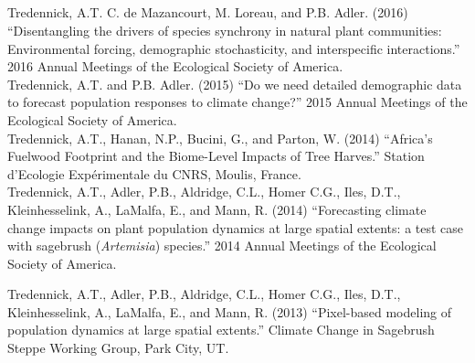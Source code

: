 \documentclass[margin,line]{resume}
\begin{document}
\begin{resume}
     \section{\textmd{\textsf{\color{MidnightBlue}{Presentations}}}}
        Tredennick, A.T. C. de Mazancourt, M. Loreau, and P.B. Adler. (2016) ``Disentangling the drivers of species synchrony in natural plant communities: Environmental forcing, demographic stochasticity, and interspecific interactions.'' 2016 Annual Meetings of the Ecological Society of America.\vspace{-6mm}\\%
        
    Tredennick, A.T. and P.B. Adler. (2015) ``Do we need detailed demographic data to forecast population responses to climate change?'' 2015 Annual Meetings of the Ecological Society of America.\vspace{-6mm}\\%
    
    Tredennick, A.T., Hanan, N.P., Bucini, G., and Parton, W. (2014) ``Africa's Fuelwood Footprint and the Biome-Level Impacts of Tree Harves.'' Station d'Ecologie Exp\'{e}rimentale du CNRS, Moulis, France. \vspace{-6mm}\\%
    
    Tredennick, A.T., Adler, P.B., Aldridge, C.L., Homer C.G., Iles, D.T., Kleinhesselink, A., LaMalfa, E., and Mann, R. (2014) ``Forecasting climate change impacts on plant population dynamics at large spatial extents: a test case with sagebrush (\emph{Artemisia}) species.'' 2014 Annual Meetings of the Ecological Society of America.\vspace{-6mm}\\%
    
          \newpage{} 
    
    Tredennick, A.T., Adler, P.B., Aldridge, C.L., Homer C.G., Iles, D.T., Kleinhesselink, A., LaMalfa, E., and Mann, R. (2013) ``Pixel-based modeling of population dynamics at large spatial extents.'' Climate Change in Sagebrush Steppe Working Group, Park City, UT. \vspace{-6mm}\\%
    

\end{resume}
\end{document}
